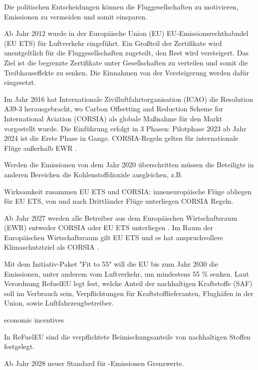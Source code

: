 Die politischen Entscheidungen können die Fluggesellschaften zu motivieren, Emissionen zu vermeiden und somit einsparen.

Ab Jahr 2012 wurde in der Europäische Union (EU) EU-Emissionsrechthabndel (EU ETS) für Luftverkehr eingeführt.
Ein Großteil der Zertifikate wird unentgeltlich für die Fluggesellschaften zugeteilt, den Rest wird versteigert. 
Das Ziel ist die begrenzte Zertifikate unter Gesellschaften zu verteilen und somit die Treibhauseffekte zu senken.
Die Einnahmen von der Versteigerung werden dafür eingesetzt.\cite{conrady2019luftverkehr}

Im Jahr 2016 hat Internationale Zivilluftfahrtorganisation (ICAO) die Resolution A39-3 herausgebracht, 
wo Carbon Offsetting and Reduction Scheme for International Aviation (CORSIA) als globale Maßnahme für den Markt vorgestellt wurde. 
Die Einführung erfolgt in 3 Phasen: 
Pilotphase 2023 ab Jahr 2024 ist die Erste Phase in Gange. \cite{conrady2019luftverkehr} CORSIA-Regeln gelten für 
internationale Flüge außerhalb EWR \cite{uba_aviation_2023}.

Werden die Emissionen von dem Jahr 2020 überschritten müssen die Beteiligte in anderen Bereichen die Kohlenstoffdioxide ausgleichen, z.B. 

Wirksamkeit zusammen EU ETS und CORSIA: inneneuropäische Flüge abliegen für EU ETS, von und nach Drittländer Flüge unterliegen CORSIA Regeln.

Ab Jahr 2027 werden alle Betreiber aus dem Europäischen Wirtschaftsraum (EWR) entweder CORSIA oder EU ETS unterliegen \cite{uba_aviation_2023}.
Im Raum der Europäischen Wirtschaftsraum gilt EU ETS und es hat anspruchvollere Klimaschutztziel als CORSIA \cite{uba_aviation_2023}.

Mit dem Initiativ-Paket "Fit to 55" will die EU bis zum Jahr 2030 die Emissionen, unter anderem vom Luftverkehr, um mindestens 55 \% senken.
Laut Verordnung RefuelEU legt fest, welche Anteil der nachhaltigen Kraftstoffe (SAF) soll im Verbrauch sein, Verpflichtungen für 
Kraftstofflieferanten, Flughäfen in der Union, sowie Luftfahrzeugbetreiber.

economic incentives 

In ReFuelEU sind die verpflichtete Beimischungsanteile von nachhaltigen Stoffen festgelegt.

Ab Jahr 2028 neuer Standard für -Emissionen Grenzwerte.